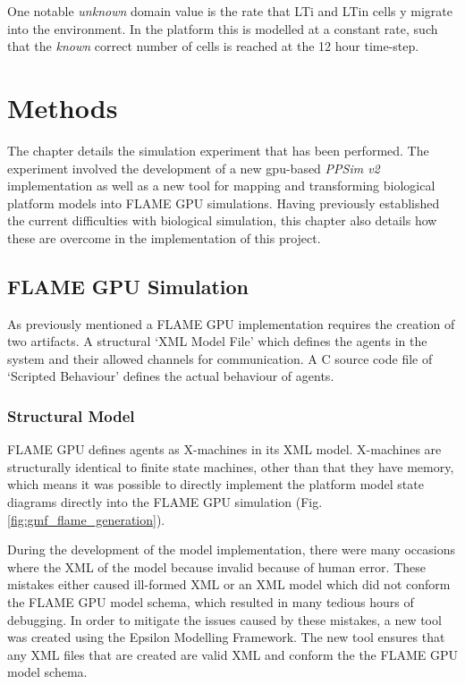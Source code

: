 \documentclass{UoYCSproject}
\begin{document}
One notable \textit{unknown} domain value is the rate that \gls{LTi} and \gls{LTin} cells y migrate into the environment.
In the \gls{platform} this is modelled at a constant rate, such that the \textit{known} correct number of cells is reached at the 12 hour time-step.

\chapter{Methods}
\label{methods}

The chapter details the simulation experiment that has been performed.
The experiment involved the development of a new \acrshort{gpu}-based \textit{PPSim v2} implementation as well as a new tool for mapping and transforming biological platform models into \gls{FLAME GPU} simulations.
Having previously established the current difficulties with biological simulation, this chapter also details how these are overcome in the implementation of this project.

\section{\gls{FLAME GPU} Simulation}
As previously mentioned a \gls{FLAME GPU} implementation requires the creation of two artifacts.
A structural `XML Model File' which defines the agents in the system and their allowed channels for communication.
A C source code file of `Scripted Behaviour' defines the actual behaviour of agents.

\subsection{Structural Model}
\gls{FLAME GPU} defines agents as X-machines in its XML model.
X-machines are structurally identical to finite state machines, other than that they have memory, which means it was possible to directly implement the platform model state diagrams directly into the \gls{FLAME GPU} simulation (Fig. \ref{fig:gmf_flame_generation}).

During the development of the model implementation, there were many occasions where the XML of the model because invalid because of human error.
These mistakes either caused ill-formed XML or an XML model which did not conform the \gls{FLAME GPU} model schema, which resulted in many tedious hours of debugging.
In order to mitigate the issues caused by these mistakes, a new tool was created using the Epsilon Modelling Framework.
The new tool ensures that any XML files that are created are valid XML and conform the the \gls{FLAME GPU} model schema.
\end{document}
